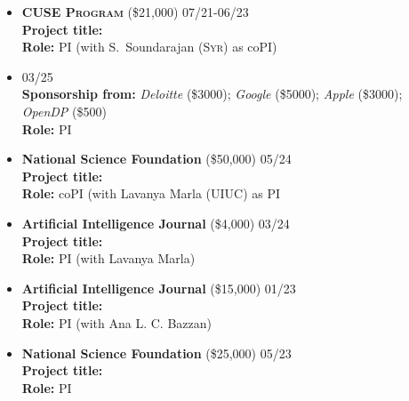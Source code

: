 \begin{itemize}
	\item
	\textbf{\textsc{CUSE Program}}
	(\$21,000)
	\hfill\textsc{07/21-06/23}\\
	{\bf Project title:} \\
	{\bf Role:} PI (with S.~Soundarajan (\textsc{Syr}) as coPI)	
\end{itemize}


\begin{itemize}
	\item {} \hfill\textsc{03/25}\\
	{\bf Sponsorship from:} 
	\textit{Deloitte} {(\$3000)};
	\textit{Google} {(\$5000)}; 
	\textit{Apple} {(\$3000)};
	\textit{OpenDP} {(\$500)}\\
	{\bf Role:} PI

	\item
	\textbf{National Science Foundation}
	{(\$50,000)} \hfill\textsc{05/24}\\
	{\bf Project title:} \\
	{\bf Role:} coPI (with Lavanya Marla (\textsc{UIUC}) as PI

	\item
	\textbf{Artificial Intelligence Journal}
	{(\$4,000)} \hfill\textsc{03/24}\\
	{\bf Project title:} \\
	{\bf Role:} PI {(with Lavanya Marla)}
	
	\item
	\textbf{Artificial Intelligence Journal}
	({\$15,000}) \hfill\textsc{01/23}\\
	{\bf Project title:} \\
	{\bf Role: } PI (with Ana L. C. Bazzan)

	\item
	\textbf{National Science Foundation}
	{(\$25,000)}
	\hfill\textsc{05/23}\\
	{\bf Project title:} \\
	{\bf Role:} PI


\end{itemize}

